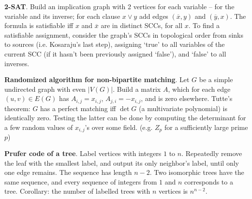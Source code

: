 \documentclass[a4paper, 12pt]{article}
\newcommand{\Topic}[1]{\textbf{#1}}
\begin{document}
\Topic{2-SAT}. Build an implication graph with 2 vertices for each
variable -- for the variable and its inverse; for each clause $x \lor y$
add edges $({\overline x}, y)$ and $({\overline y}, x)$.
The formula is satisfiable iff $x$ and ${\overline x}$ are in distinct SCCs,
for all $x$. To find a satisfiable assignment, consider the graph's SCCs
in topological order from sinks to sources (i.e. Kosaraju's last step), assigning `true' to
all variables of the current SCC (if it hasn't been previously
assigned `false'), and `false' to all inverses.

\begin{comment}
\Topic{Bridges and biconnected components}.
\vspace{-3mm}
\begin{verbatim}
int N, counter, seen[MAXN], low[MAXN];  vector<int> stk;

void dfs(int x, int parent) {
    int kids = 0, art = 0;

    low[x] = seen[x] = ++counter;
    stk.push_back(x);

    for each node y adjacent to x do {
        if (y == parent) continue;
        if (seen[y] == 0) {
            dfs(y, x);
            low[x] = min(low[x], low[y]);
            art |= (low[y] >= seen[x]);
            kids++;
            if (low[y] == seen[y]) output "Edge (x, y) is a bridge";
        } else {
            low[x] = min(low[x], seen[y]);
        }
    }

    if ((parent == -1 && kids >= 2) || (parent != -1 && art))
        output "Vertex x is an articulation point";

    if (low[x] == seen[x]) {
        pop all vertices up to x from stack 'stk', and output them
        as a single biconnected component.
    }
}
...
memset(seen, 0, sizeof(seen)); counter = 0; stk.clear(); dfs(..., -1);
\end{verbatim}
\end{comment}

\Topic{Randomized algorithm for non-bipartite matching}.
Let $G$ be a simple undirected graph with even $|V(G)|$.
Build a matrix $A$, which for each edge $(u,v) \in E(G)$ has
$A_{i,j}=x_{i,j}$, $A_{j,i}=-x_{i,j}$, and is zero elsewhere.
Tutte's theorem: $G$ has a perfect matching iff $\det G$ (a multivariate
polynomial) is identically zero.
Testing the latter can be done by computing the determinant for
a few random values of $x_{i,j}$'s over some field.
(e.g. $Z_p$ for a sufficiently large prime $p$)

\Topic{Prufer code of a tree}.
Label vertices with integers $1$ to $n$.
Repeatedly remove the leaf with the smallest label, and output its only
neighbor's label, until only one edge remains. The sequence has
length $n-2$.  Two isomorphic trees have the same sequence, and every sequence
of integers from $1$ and $n$ corresponds to a tree.
Corollary: the number of labelled trees with $n$ vertices is $n^{n-2}$.  %
\end{document}
